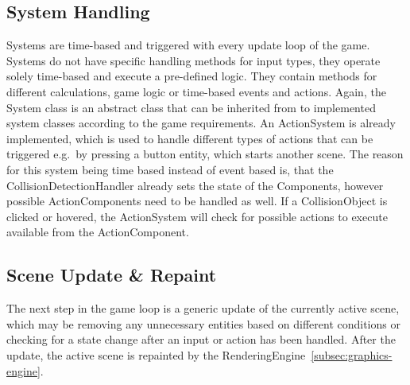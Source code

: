 \subsection{System Handling}\label{subsec:system-handling}
Systems are time-based and triggered with every update loop of the game.
Systems do not have specific handling methods for input types, they operate solely time-based and execute a pre-defined logic.
They contain methods for different calculations, game logic or time-based events and actions.
Again, the System class is an abstract class that can be inherited from to implemented system classes according to the game requirements.
An ActionSystem is already implemented, which is used to handle different types of actions that can be triggered e.g.\ by pressing a button entity, which starts
another scene.
The reason for this system being time based instead of event based is, that the CollisionDetectionHandler already sets the state of the Components,
however possible ActionComponents need to be handled as well.
If a CollisionObject is clicked or hovered, the ActionSystem will check for possible actions to execute available from the ActionComponent.

\subsection{Scene Update \& Repaint}\label{subsec:scene-update-&-repaint}
The next step in the game loop is a generic update of the currently active scene, which may be removing any unnecessary entities based on different conditions or
checking for a state change after an input or action has been handled.
After the update, the active scene is repainted by the RenderingEngine~\ref{subsec:graphics-engine}.

